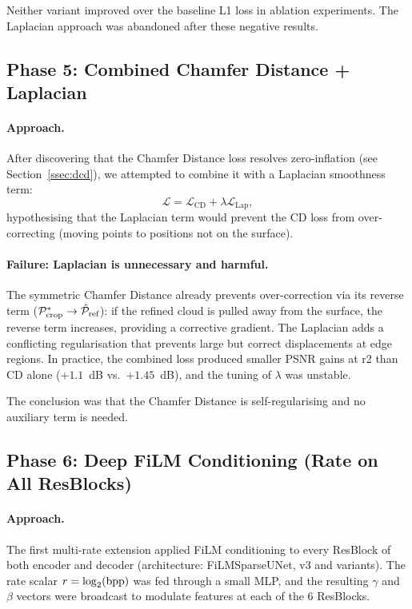 Neither variant improved over the baseline L1 loss in ablation experiments.
The Laplacian approach was abandoned after these negative results.

\subsection{Phase 5: Combined Chamfer Distance + Laplacian}

\paragraph{Approach.}
After discovering that the Chamfer Distance loss resolves zero-inflation
(see Section~\ref{ssec:dcd}), we attempted to combine it with a Laplacian
smoothness term:
\begin{equation}
  \mathcal{L} = \mathcal{L}_{\text{CD}} + \lambda \mathcal{L}_{\text{Lap}},
\end{equation}
hypothesising that the Laplacian term would prevent the CD loss from
over-correcting (moving points to positions not on the surface).

\paragraph{Failure: Laplacian is unnecessary and harmful.}
The symmetric Chamfer Distance already prevents over-correction via its
reverse term ($\mathcal{P}^*_{\text{crop}} \to \hat{\mathcal{P}}_{\text{ref}}$): if the refined
cloud is pulled away from the surface, the reverse term increases, providing
a corrective gradient.
The Laplacian adds a conflicting regularisation that prevents large but correct
displacements at edge regions.
In practice, the combined loss produced smaller PSNR gains at r2 than CD alone
($+1.1$~dB vs.\ $+1.45$~dB), and the tuning of $\lambda$ was unstable.

The conclusion was that the Chamfer Distance is self-regularising and no
auxiliary term is needed.

\subsection{Phase 6: Deep FiLM Conditioning (Rate on All ResBlocks)}

\paragraph{Approach.}
The first multi-rate extension applied FiLM conditioning to every ResBlock
of both encoder and decoder (architecture: FiLMSparseUNet, v3 and variants).
The rate scalar $r = \log_2(\mathrm{bpp})$ was fed through a small MLP, and the
resulting $\gamma$ and $\beta$ vectors were broadcast to modulate features
at each of the 6 ResBlocks.

